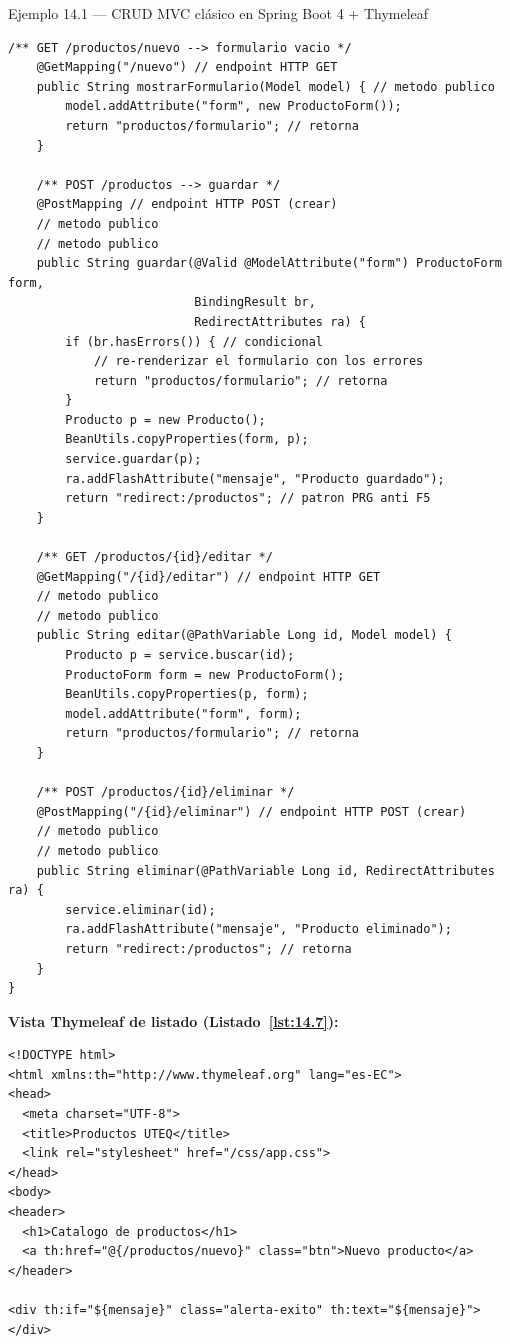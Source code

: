 \begin{cajaejemplo}{Ejemplo 14.1 --- CRUD MVC clásico en Spring Boot 4 + Thymeleaf}
\begin{lstlisting}[style=java,caption={ProductoController.java},label=lst:14.6]
    /** GET /productos/nuevo --> formulario vacio */
    @GetMapping("/nuevo") // endpoint HTTP GET
    public String mostrarFormulario(Model model) { // metodo publico
        model.addAttribute("form", new ProductoForm());
        return "productos/formulario"; // retorna
    }

    /** POST /productos --> guardar */
    @PostMapping // endpoint HTTP POST (crear)
    // metodo publico
    // metodo publico
    public String guardar(@Valid @ModelAttribute("form") ProductoForm form,
                          BindingResult br,
                          RedirectAttributes ra) {
        if (br.hasErrors()) { // condicional
            // re-renderizar el formulario con los errores
            return "productos/formulario"; // retorna
        }
        Producto p = new Producto();
        BeanUtils.copyProperties(form, p);
        service.guardar(p);
        ra.addFlashAttribute("mensaje", "Producto guardado");
        return "redirect:/productos"; // patron PRG anti F5
    }

    /** GET /productos/{id}/editar */
    @GetMapping("/{id}/editar") // endpoint HTTP GET
    // metodo publico
    // metodo publico
    public String editar(@PathVariable Long id, Model model) {
        Producto p = service.buscar(id);
        ProductoForm form = new ProductoForm();
        BeanUtils.copyProperties(p, form);
        model.addAttribute("form", form);
        return "productos/formulario"; // retorna
    }

    /** POST /productos/{id}/eliminar */
    @PostMapping("/{id}/eliminar") // endpoint HTTP POST (crear)
    // metodo publico
    // metodo publico
    public String eliminar(@PathVariable Long id, RedirectAttributes ra) {
        service.eliminar(id);
        ra.addFlashAttribute("mensaje", "Producto eliminado");
        return "redirect:/productos"; // retorna
    }
}
\end{lstlisting}

\textbf{Vista Thymeleaf de listado (Listado~\ref{lst:14.7}):}
\begin{lstlisting}[style=html,caption={templates/productos/lista.html},label=lst:14.7]
<!DOCTYPE html>
<html xmlns:th="http://www.thymeleaf.org" lang="es-EC">
<head>
  <meta charset="UTF-8">
  <title>Productos UTEQ</title>
  <link rel="stylesheet" href="/css/app.css">
</head>
<body>
<header>
  <h1>Catalogo de productos</h1>
  <a th:href="@{/productos/nuevo}" class="btn">Nuevo producto</a>
</header>

<div th:if="${mensaje}" class="alerta-exito" th:text="${mensaje}"></div>


\end{lstlisting}
\end{cajaejemplo}
